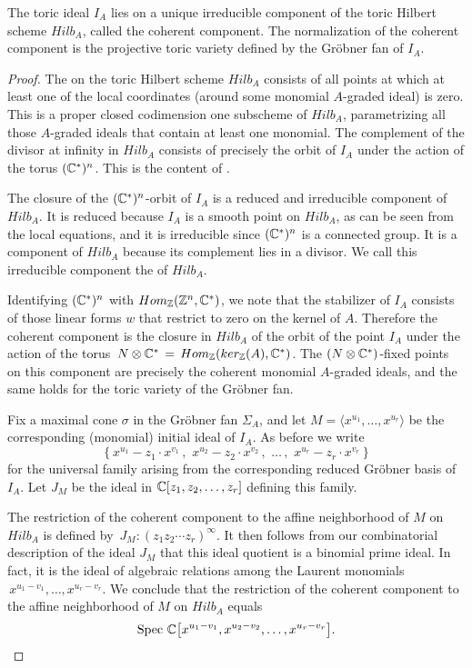 \begin{theorem}
The toric ideal $I_A$ lies on a unique irreducible component of
the toric Hilbert scheme $Hilb_A$, called the coherent component.
The normalization of the coherent
component is the projective toric variety defined by 
the Gr\"obner fan of $I_A$.
\end{theorem}

\begin{proof}
The {\it {}} on the toric Hilbert scheme $Hilb_A$ 
consists of all points at which at least one of the local coordinates
(around some monomial $A$-graded ideal) is zero.  This is a proper
closed codimension one subscheme of $Hilb_A$, parametrizing
all those $A$-graded ideals that contain at least one monomial.  
The complement of the divisor at infinity in 
$Hilb_A$ consists of precisely  the orbit of $I_A$ 
under the action of the torus $(\mathbb{C}^*)^n $.
This is the content of \cite[Lemma 10.12]{HS:St2}.

The closure of the $(\mathbb{C}^*)^n $-orbit of $I_A$ is a
reduced and irreducible component of  $Hilb_A$.
It is reduced because $I_A$ is a smooth point on $Hilb_A$,
as can be seen from the local equations, and it is irreducible
since $(\mathbb{C}^*)^n$ is a connected group. It is a component
of $Hilb_A$ because its complement lies in a divisor.
We call this irreducible component the
{\it {}} of $Hilb_A$.

Identifying $(\mathbb{C}^*)^n$ with $Hom_{\mathbb{Z}}(\mathbb{Z}^n, \mathbb{C}^*)$, we note
that the stabilizer of $I_A$ consists of those linear forms
$w$ that restrict to zero on the kernel of $A$. Therefore
the coherent component is the closure in $Hilb_A$
of the  orbit of the point $I_A$ under the action of the torus
$\, N \otimes \mathbb{C}^* \, = \,Hom_{\mathbb{Z}}( ker_{\mathbb{Z}}(A), \mathbb{C}^*)$.
The $(N \otimes \mathbb{C}^*)$-fixed points
on this component are precisely the coherent monomial 
$A$-graded ideals, and the same holds for the
toric variety of the Gr\"obner fan. 

Fix a maximal cone $\sigma$ in the Gr\"obner fan $\Sigma_A$,
and let $M = \langle x^{u_1}, \ldots, x^{u_r} \rangle$ 
be the corresponding (monomial) 
initial ideal of $I_A$.  As before we write
$$ \left \{ x^{u_1} -  z_1 \cdot x^{v_1} \,, \,\,
 x^{u_2} - z_2  \cdot x^{v_2} \,,\, \, \ldots \, ,
\,\, x^{u_r} -   z_r \cdot x^{v_r} \right \}$$
for the universal family arising from the corresponding
reduced Gr\"obner basis of $I_A$.  Let $J_M$ be the
ideal in $\mathbb{C} [z_1,z_2,\ldots,z_r]$ defining this family.

The restriction of the coherent component to the 
affine neighborhood of $M$ on $Hilb_A$ is defined
by $\, J_M :  (z_1 z_2 \cdots z_r)^\infty $.
It then follows from our combinatorial description of
the ideal $J_M$ that this ideal quotient is a binomial prime ideal.
In fact, it is the ideal of algebraic relations among the 
Laurent monomials $\, x^{u_1- v_1}, \ldots, x^{u_r-v_r}$.
We conclude that the restriction of the coherent component to the
affine neighborhood of $M$ on $Hilb_A$ equals
\begin{equation}
\label{uv-algebra}
 {\rm Spec} \,\, \mathbb{C} \bigl[
 x^{u_1-v_1},
 x^{u_2-v_2},  \ldots,
 x^{u_r-v_r} 
\bigr] .
\end{equation}


\end{proof}
